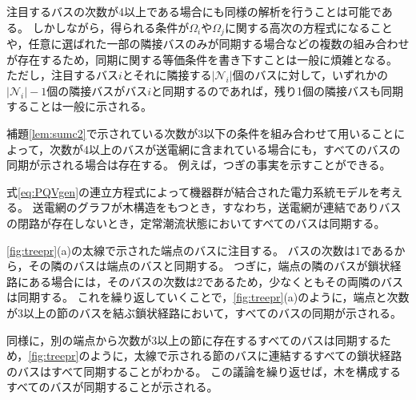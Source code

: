 \documentclass[tombow,dvipdfmx]{corona-a5}
\begin{document}
注目するバスの次数が4以上である場合にも同様の解析を行うことは可能である。
しかしながら，得られる条件が$\Omega_i$や$\Omega_j$に関する高次の方程式になることや，任意に選ばれた一部の隣接バスのみが同期する場合などの複数の組み合わせが存在するため，同期に関する等価条件を書き下すことは一般に煩雑となる。
ただし，注目するバス$i$とそれに隣接する$|\mathcal{N}_i|$個のバスに対して，いずれかの$|\mathcal{N}_i |-1$個の隣接バスがバス$i$と同期するのであれば，残り1個の隣接バスも同期することは一般に示される。

補題\ref{lem:sumc2}で示されている次数が3以下の条件を組み合わせて用いることによって，次数が4以上のバスが送電網に含まれている場合にも，すべてのバスの同期が示される場合は存在する。
例えば，つぎの事実を示すことができる。

\begin{定理}[木構造の送電網におけるバスの同期]
\label{thm:tree}
式\ref{eq:PQVgen}の連立方程式によって機器群が結合された電力系統モデルを考える。
送電網のグラフが木構造をもつとき，すなわち，送電網が連結でありバスの閉路が存在しないとき，定常潮流状態においてすべてのバスは同期する。
\end{定理}

\begin{証明}
\ref{fig:treepr}(a)の太線で示された端点のバスに注目する。
バスの次数は1であるから，その隣のバスは端点のバスと同期する。
つぎに，端点の隣のバスが鎖状経路にある場合には，そのバスの次数は2であるため，少なくともその両隣のバスは同期する。
これを繰り返していくことで，\ref{fig:treepr}(a)のように，端点と次数が3以上の節のバスを結ぶ鎖状経路において，すべてのバスの同期が示される。

同様に，別の端点から次数が3以上の節に存在するすべてのバスは同期するため，\ref{fig:treepr}のように，太線で示される節のバスに連結するすべての鎖状経路のバスはすべて同期することがわかる。
この議論を繰り返せば，木を構成するすべてのバスが同期することが示される。
\end{証明}
\end{document}
